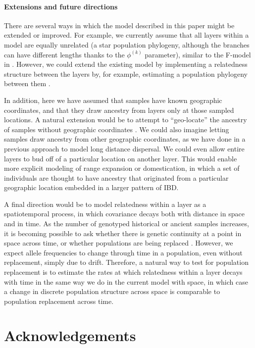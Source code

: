 \documentclass[12pt]{article}
\begin{document}
\paragraph{Extensions and future directions}
There are several ways in which the model described in this paper might be extended or improved.  
For example, we currently assume that all layers within a model are equally unrelated 
(a star population phylogeny, although the branches can have different lengths thanks to the $\phi^{(k)}$ parameter), 
similar to the F-model in \citet{falush2003}.
However, we could extend the existing model by implementing 
a relatedness structure between the layers by, for example, 
estimating a population phylogeny between them
\citep[e.g.][]{treemix}.

In addition, here we have assumed that samples have known geographic coordinates, 
and that they draw ancestry from layers only at those sampled locations. 
A natural extension would be to attempt to ``geo-locate'' 
the ancestry of samples without geographic coordinates \citep{Wasser2004}. 
We could also imagine letting samples draw ancestry from other geographic coordinates, 
as we have done in a previous approach \citep{spacemix} to model long distance dispersal. 
We could even allow entire layers to bud off of a particular location on another layer. 
This would enable more explicit modeling of range expansion or domestication, 
in which a set of individuals are thought to have ancestry that originated from
a particular geographic location embedded in a larger pattern of IBD.

A final direction would be to model relatedness within a layer as a spatiotemporal process, 
in which covariance decays both with distance in space and in time.  
As the number of genotyped historical or ancient samples increases, 
it is becoming possible to ask whether there is genetic continuity at a point in space across time, 
or whether populations are being replaced \citep{lazaridis_ancient_2014, Haak2015, slatkin_racimo2016, Nielsen2017, Schraiber2017}.
However, we expect allele frequencies to change through time in a population, 
even without replacement, simply due to drift.
Therefore, a natural way to test for population replacement is to estimate the rates 
at which relatedness within a layer decays with time in the same way we do in the current model with space, 
in which case a change in discrete population structure across space is comparable to population replacement across time.

\section*{Acknowledgements}
\end{document}
